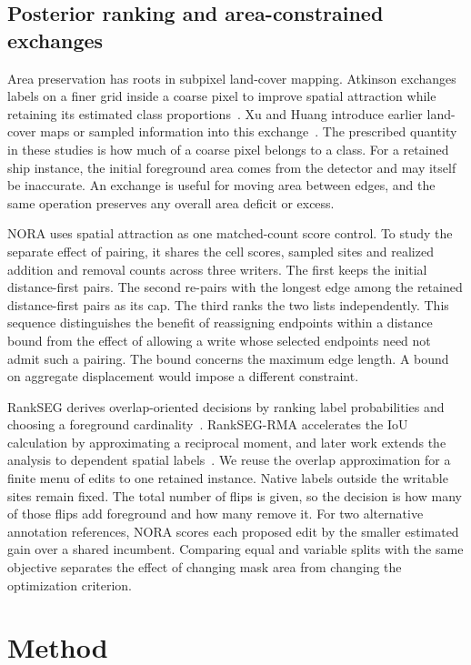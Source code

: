 \documentclass[journal]{IEEEtran}
\begin{document}
\subsection{Posterior ranking and area-constrained exchanges}

Area preservation has roots in subpixel land-cover mapping. Atkinson exchanges labels on a finer grid inside a coarse pixel to improve spatial attraction while retaining its estimated class proportions~\cite{atkinson}. Xu and Huang introduce earlier land-cover maps or sampled information into this exchange~\cite{xu}. The prescribed quantity in these studies is how much of a coarse pixel belongs to a class. For a retained ship instance, the initial foreground area comes from the detector and may itself be inaccurate. An exchange is useful for moving area between edges, and the same operation preserves any overall area deficit or excess.

NORA uses spatial attraction as one matched-count score control. To study the separate effect of pairing, it shares the cell scores, sampled sites and realized addition and removal counts across three writers. The first keeps the initial distance-first pairs. The second re-pairs with the longest edge among the retained distance-first pairs as its cap. The third ranks the two lists independently. This sequence distinguishes the benefit of reassigning endpoints within a distance bound from the effect of allowing a write whose selected endpoints need not admit such a pairing. The bound concerns the maximum edge length. A bound on aggregate displacement would impose a different constraint.

RankSEG derives overlap-oriented decisions by ranking label probabilities and choosing a foreground cardinality~\cite{rankseg}. RankSEG-RMA accelerates the IoU calculation by approximating a reciprocal moment, and later work extends the analysis to dependent spatial labels~\cite{rankrma,rankdep}. We reuse the overlap approximation for a finite menu of edits to one retained instance. Native labels outside the writable sites remain fixed. The total number of flips is given, so the decision is how many of those flips add foreground and how many remove it. For two alternative annotation references, NORA scores each proposed edit by the smaller estimated gain over a shared incumbent. Comparing equal and variable splits with the same objective separates the effect of changing mask area from changing the optimization criterion.

\section{Method}
\label{sec:method}
\end{document}
